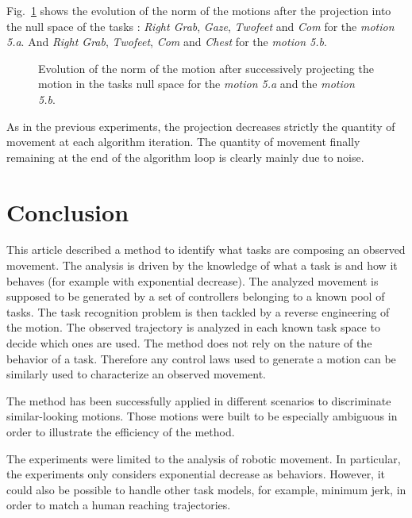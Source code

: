 \documentclass[letterpaper, 10pt, conference]{ieeeconf}      %
\begin{document}
Fig.~\ref{fig:exp6:PqdotNorms5} shows the evolution of the norm of the motions after the projection
into the null space of the tasks : \emph{Right Grab},  \emph{Gaze}, \emph{Twofeet} and \emph{Com} for
the \emph{motion 5.a}. And \emph{Right Grab}, \emph{Twofeet}, \emph{Com} and \emph{Chest} for the
\emph{motion 5.b}.
\begin{figure}[t]
  \centering
  \subfigure[Motion 5.a]{
  \resizebox{.48\textwidth}{!} {
    
  }
  }
  \subfigure[Motion 5.b]{
  \resizebox{.48\textwidth}{!} {
    
  }
}
\caption{Evolution of the norm of the motion after successively projecting the motion in the tasks null space for
the \emph{motion 5.a} and the \emph{motion 5.b}.}
\label{fig:exp6:PqdotNorms5}
\end{figure}
As in the previous experiments, the projection decreases strictly the quantity of movement
at each algorithm iteration. The quantity of movement finally remaining at the end of 
the algorithm loop is clearly mainly due to noise.

\section{Conclusion}
This article described a method to identify what tasks are composing an observed movement.
The analysis is driven by the knowledge
of what a task is and how it behaves (for example with exponential decrease). 
The analyzed movement is supposed to be generated by a set of 
controllers belonging to a known pool of tasks. 
The task recognition problem is then tackled by a reverse engineering of the motion.
The observed trajectory is analyzed
in each known task space to decide which ones are used.
The method does not rely on the nature of the behavior of a task. Therefore
any control laws used to generate a motion can be similarly
used to characterize an observed movement.

The method has been successfully applied in different
scenarios to discriminate similar-looking motions. Those motions were built to be especially
ambiguous in order to illustrate the efficiency of the method.

The experiments were limited to the analysis of robotic movement. In particular,
the experiments only considers exponential decrease as behaviors.
However, it could also be possible to handle other task models, for example, minimum jerk,
in order to match a human reaching trajectories.
\end{document}
